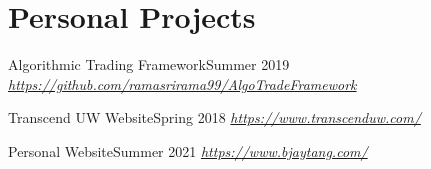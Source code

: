 \section{Personal Projects}
  \CVSubHeadingListStart
    \CVSubheading
      {Algorithmic Trading Framework}{Summer 2019}
      {\emph{\small{\href{https://github.com/ramasrirama99/AlgoTradeFramework}{https://github.com/ramasrirama99/AlgoTradeFramework}}}}{}

    \CVSubheading
      {Transcend UW Website}{Spring 2018}
      {\emph{\small{\href{https://www.transcenduw.com/}{https://www.transcenduw.com/}}}}{}
      
    \CVSubheading
      {Personal Website}{Summer 2021} 
      {\emph{\small{\href{https://www.bjaytang.com/}{https://www.bjaytang.com/}}}}{}


  \CVSubHeadingListEnd